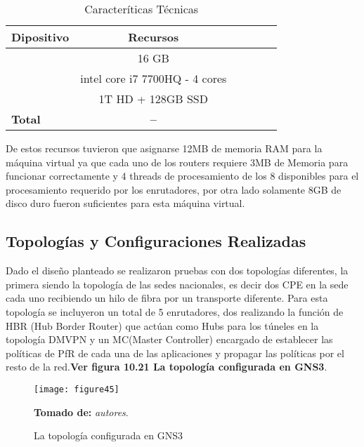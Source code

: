 \begin{table}[ht]
	\caption{Caracteríticas Técnicas}
	\label{tab:hla:results}
\centering
\begin{tabular}{lccccc}
	\toprule
	\multicolumn{1}{c}{\textbf{Dipositivo}} 	& \textbf{Recursos}\\
	\midrule
\cite{Memoria RAM} 		& 16 GB \\
\cite{CPU} 		& intel core i7 7700HQ - 4 cores \\
\cite{Disco Duro} 		& 1T HD + 128GB SSD \\
	\midrule
	\textbf{Total}			& \textbf{--} \\
	\bottomrule
\end{tabular}
\end{table}

De estos recursos tuvieron que asignarse 12MB de memoria RAM para la máquina virtual ya que cada uno de los routers requiere 3MB de Memoria para funcionar correctamente y 4 threads de procesamiento de los 8 disponibles para el procesamiento requerido por los enrutadores, por otra lado solamente 8GB de disco duro fueron suficientes para esta máquina virtual.

\subsection{Topologías y Configuraciones Realizadas} %
\label{sec:Topologías y Configuraciones Realizadas}

Dado el diseño planteado se realizaron pruebas con dos topologías diferentes, la primera siendo la topología de las sedes nacionales, es decir dos CPE en la sede cada uno recibiendo un hilo de fibra por un transporte diferente. Para esta topología se incluyeron un total de 5 enrutadores, dos realizando la función de HBR (Hub Border Router) que actúan como Hubs para los túneles en la topología DMVPN y un MC(Master Controller) encargado de establecer las políticas de PfR de cada una de las aplicaciones y propagar las políticas por el resto de la red.\textbf{Ver figura 10.21 La topología configurada en GNS3}.
\begin{figure}[htbp]
  \centering
    {\texttt{[image: figure45]}}%
  \caption{La topología configurada en GNS3}
  \textbf{Tomado de:} \textit{autores}.
  \label{fig:fig2subfig}
\end{figure}

